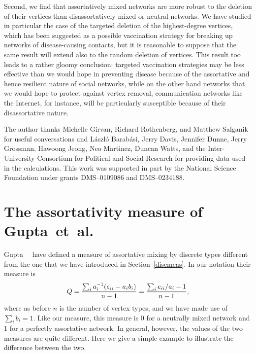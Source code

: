 \documentclass[twocolumn,pre]{revtex4}
\begin{document}
Second, we find that assortatively mixed networks are more robust to the
deletion of their vertices than disassortatively mixed or neutral networks.
We have studied in particular the case of the targeted deletion of the
highest-degree vertices, which has been suggested as a possible vaccination
strategy for breaking up networks of disease-causing contacts, but it is
reasonable to suppose that the same result will extend also to the random
deletion of vertices.  This result too leads to a rather gloomy conclusion:
targeted vaccination strategies may be less effective than we would hope in
preventing disease because of the assortative and hence resilient nature of
social networks, while on the other hand networks that we would hope to
protect against vertex removal, communication networks like the Internet,
for instance, will be particularly susceptible because of their
disassortative nature.


\begin{acknowledgments}
  The author thanks Michelle Girvan, Richard Rothenberg, and Matthew
  Salganik for useful conversations and L\'aszl\'o Barab\'asi, Jerry Davis,
  Jennifer Dunne, Jerry Grossman, Hawoong Jeong, Neo Martinez, Duncan
  Watts, and the Inter-University Consortium for Political and Social
  Research for providing data used in the calculations.  This work was
  supported in part by the National Science Foundation under grants
  DMS--0109086 and DMS--0234188.
\end{acknowledgments}


\appendix
\section{The assortativity measure of Gupta~et~al.}
\label{appa}
Gupta~\etal~\cite{GAM89} have defined a measure of assortative mixing by
discrete types different from the one that we have introduced in
Section~\ref{discmeas}.  In our notation their measure is
\begin{equation}
Q = {\sum_i a_i^{-1} (e_{ii} - a_i b_i)\over n-1}
  = {\sum_i e_{ii}/a_i - 1\over n - 1},
\end{equation}
where as before $n$ is the number of vertex types, and we have made use of
$\sum_i b_i = 1$.  Like our measure, this measure is 0 for a neutrally
mixed network and 1 for a perfectly assortative network.  In general,
however, the values of the two measures are quite different.  Here we give
a simple example to illustrate the difference between the two.
\end{document}
